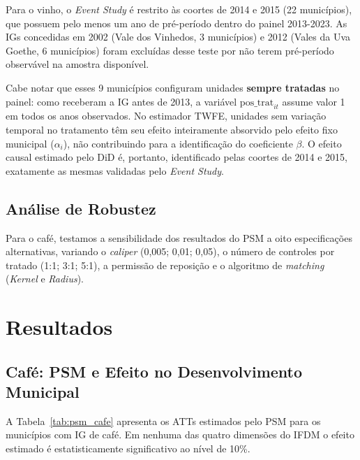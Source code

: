 \documentclass[12pt, a4paper]{article}
\begin{document}
Para o vinho, o \textit{Event Study} é restrito às coortes de 2014 e 2015 (22 municípios), que possuem pelo menos um ano de pré-período dentro do painel 2013-2023. As IGs concedidas em 2002 (Vale dos Vinhedos, 3 municípios) e 2012 (Vales da Uva Goethe, 6 municípios) foram excluídas desse teste por não terem pré-período observável na amostra disponível.

Cabe notar que esses 9 municípios configuram unidades \textbf{sempre tratadas} no painel: como receberam a IG antes de 2013, a variável $\text{pos\_trat}_{it}$ assume valor 1 em todos os anos observados. No estimador TWFE, unidades sem variação temporal no tratamento têm seu efeito inteiramente absorvido pelo efeito fixo municipal ($\alpha_i$), não contribuindo para a identificação do coeficiente $\beta$. O efeito causal estimado pelo DiD é, portanto, identificado pelas coortes de 2014 e 2015, exatamente as mesmas validadas pelo \textit{Event Study}.

\subsection{Análise de Robustez}

Para o café, testamos a sensibilidade dos resultados do PSM a oito especificações alternativas, variando o \textit{caliper} (0,005; 0,01; 0,05), o número de controles por tratado (1:1; 3:1; 5:1), a permissão de reposição e o algoritmo de \textit{matching} (\textit{Kernel} e \textit{Radius}).

\section{Resultados}

\subsection{Café: PSM e Efeito no Desenvolvimento Municipal}

A Tabela~\ref{tab:psm_cafe} apresenta os ATTs estimados pelo PSM para os municípios com IG de café. Em nenhuma das quatro dimensões do IFDM o efeito estimado é estatisticamente significativo ao nível de 10\%.
\end{document}
